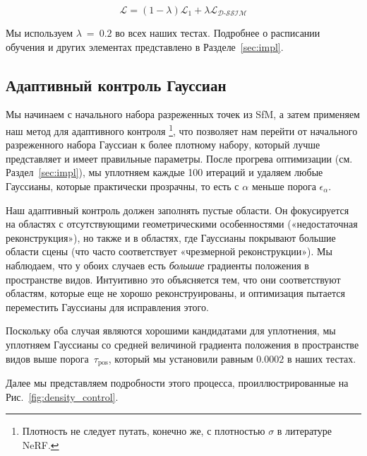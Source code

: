 \begin{equation}
    \mathcal{L} = (1 - \lambda) \mathcal{L}_1 + \lambda \mathcal{L_{\textrm{D-SSIM}}}
\end{equation}

Мы используем $\lambda~=~0.2$ во всех наших тестах.
Подробнее о расписании обучения и других элементах представлено в Разделе~\ref{sec:impl}.

\subsection{Адаптивный контроль Гауссиан}

Мы начинаем с начального набора разреженных точек из SfM, а затем применяем наш метод для адаптивного контроля \footnote{Плотность  не следует путать, конечно же, с плотностью $\sigma$ в литературе NeRF.}, что позволяет нам перейти от начального разреженного набора Гауссиан к более плотному набору, который лучше представляет  и имеет правильные параметры. 
После прогрева оптимизации (см. Раздел~\ref{sec:impl}), мы уплотняем каждые 100 итераций и удаляем любые Гауссианы, которые практически прозрачны, то есть с $\alpha$ меньше порога $\epsilon_{\alpha}$.

Наш адаптивный контроль  должен заполнять пустые области. Он фокусируется на областях с отсутствующими геометрическими особенностями («недостаточная реконструкция»), но также и в областях, где Гауссианы покрывают большие области сцены (что часто соответствует «чрезмерной реконструкции»).
Мы наблюдаем, что у обоих случаев есть \emph{большие} градиенты положения в пространстве видов.
Интуитивно это объясняется тем, что они соответствуют областям, которые еще не хорошо реконструированы, и оптимизация пытается переместить Гауссианы для исправления этого.

Поскольку оба случая являются хорошими кандидатами для уплотнения,  мы
уплотняем Гауссианы со средней величиной градиента положения в пространстве видов выше порога~$\tau_{\textrm{pos}}$, который мы установили равным $0.0002$ в наших тестах.

Далее мы представляем подробности этого процесса, проиллюстрированные на Рис.~\ref{fig:density_control}.

